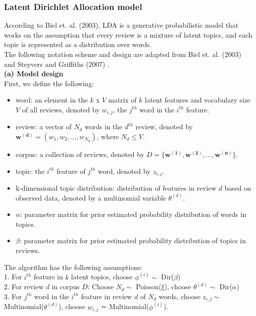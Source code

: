 \documentclass[reqno]{article}
\renewcommand{\vec}[1]{\mathbf{#1}}
\theoremstyle{definition}
\theoremstyle{definition}
\theoremstyle{remark}
\begin{document}
\subsubsection{Latent Dirichlet Allocation model}
According to Biel et. al. (2003), LDA is a generative probabilistic model that works on the assumption that every review is a mixture of latent topics, and each topic is represented as a distribution over words. \\
The following notation scheme and design are adapted from  Biel et. al. (2003) and Steyvers and Griffiths (2007)
\bigskip
\cite{Blei_Ng_Jordan} \cite{steyvers}. \\
\textbf{(a) Model design} \\
First, we define the following:
\begin{itemize}
    \item word: an element in the $k$ x $V$ matrix of $k$ latent features and vocabulary size $V$ of all reviews, denoted by $w_{i,j}$, the $j^{th}$ word in the $i^{th}$ feature.
    \item review: a vector of $N_d$ words in the $d^{th}$ review, denoted by $\vec{w^{(d)}} = (w_{1}, w_{2}, ..., w_{N_d})$, where $N_d \leq V$.
    \item corpus: a collection of reviews, denoted by $D = \{\vec{w^{(1)}},\vec{w^{(2)}},...,\vec{w^{(n)}}\}$.
    \item topic: the $i^{th}$ feature of $j^{th}$ word, denoted by $z_{i,j}$.
    \item k-dimensional topic distribution: distribution of features in review $d$ based on observed data, denoted by a multinomial variable $\theta^{(d)}$.
    \item $\alpha$: parameter matrix for prior estimated probability distribution of words in topics.
    \item $\beta$: parameter matrix for prior estimated probability distribution of topics in reviews.
\end{itemize}
The algorithm has the following assumptions:\\
1. For $i^{th}$ feature in $k$ latent topics, choose $\phi^{(i)} \sim$ Dir($\beta$)\\
2. For review $d$ in corpus $D$: Choose $N_d \sim$ Poisson($\xi$), choose $\theta^{(d)} \sim$ Dir($\alpha$)\\
3. For $j^{th}$ word in the $i^{th}$ feature in review $d$ of $N_d$ words, choose $z_{i,j} \sim$ Multinomial($\theta^{(d)}$), choose $w_{i,j}$ ∼ Multinomial($\phi^{(i)}$).\\
\end{document}
